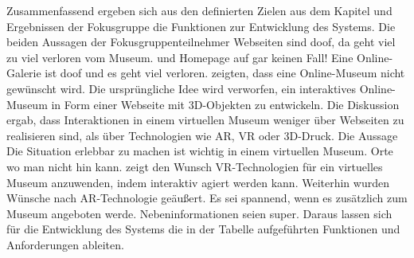 \documentclass[runningheads,a4paper, 12pt]{llncs}
\begin{document}
Zusammenfassend ergeben sich aus den definierten Zielen aus dem Kapitel  und Ergebnissen der Fokusgruppe die Funktionen zur Entwicklung des Systems. Die beiden Aussagen der Fokusgruppenteilnehmer \glqq Webseiten sind doof, da geht viel zu viel verloren vom Museum.\grqq{} und \glqq Homepage auf gar keinen Fall! Eine Online-Galerie ist doof und es geht viel verloren.\grqq{} zeigten, dass eine Online-Museum nicht gewünscht wird. Die ursprüngliche Idee wird verworfen, ein interaktives Online-Museum in Form einer Webseite mit 3D-Objekten zu entwickeln. Die Diskussion ergab, dass Interaktionen in einem virtuellen Museum weniger über Webseiten zu realisieren sind, als über Technologien wie AR, VR oder 3D-Druck. Die Aussage
\glqq Die Situation erlebbar zu machen ist wichtig in einem virtuellen Museum. Orte wo man nicht hin kann.\grqq{} 
zeigt den Wunsch VR-Technologien für ein virtuelles Museum anzuwenden, indem interaktiv agiert werden kann. Weiterhin wurden Wünsche nach AR-Technologie geäußert. Es sei spannend, wenn es zusätzlich zum Museum angeboten werde. Nebeninformationen seien super. Daraus lassen sich für die Entwicklung des Systems die in der Tabelle aufgeführten Funktionen und Anforderungen ableiten.
\newpage
\end{document}
